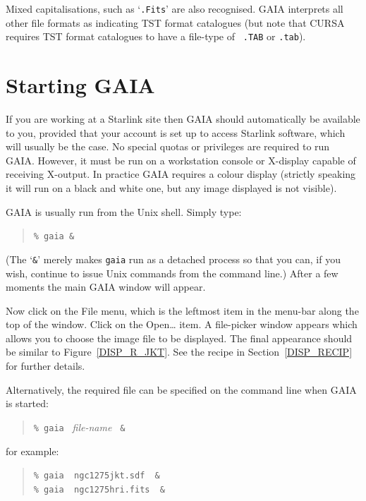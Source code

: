 \documentclass[twoside,11pt]{article}
\newcommand{\xlabel}[1]{}
\renewcommand{\_}{\texttt{\symbol{95}}}
\begin{document}
Mixed capitalisations, such as `{\tt .Fits}' are also recognised.  GAIA
interprets all other file formats as indicating TST format catalogues (but
note that CURSA requires TST format catalogues to have a file-type of {\tt
.TAB} or {\tt .tab}).


\section{\xlabel{START}\label{START}Starting GAIA}

If you are working at a Starlink site then GAIA should automatically
be available to you, provided that your account is set up to access
Starlink software, which will usually be the case.  No special quotas or
privileges are required to run GAIA.  However, it must be run on a
workstation console or X-display capable of receiving X-output.  In
practice GAIA requires a colour display (strictly speaking it will run on
a black and white one, but any image displayed is not visible).

GAIA is usually run from the Unix shell.  Simply type:

\begin{quote}
{\tt \%  gaia \&}
\end{quote}

(The `{\tt \&}' merely makes {\tt gaia} run as a detached process so that
you can, if you wish, continue to issue Unix commands from the command
line.)  After a few moments the main GAIA window will appear.

Now click on the {\sf File} menu, which is the leftmost item in the
menu-bar along the top of the window.  Click on the {\sf Open\ldots}
item.  A file-picker window appears which allows you to choose the
image file to be displayed.  The final appearance should be similar to
Figure~\ref{DISP_R_JKT}.  See the recipe in Section~\ref{DISP_RECIP} for
further details.

Alternatively, the required file can be specified on the command line
when GAIA is started:

\begin{quote}
{\tt \%  gaia} {\it ~file-name} {\tt ~\&}
\end{quote}

for example:

\begin{quote}
{\tt \%  gaia ~ngc1275jkt.sdf ~\&} \\
{\tt \%  gaia ~ngc1275hri.fits  ~\&}
\end{quote}
\end{document}
